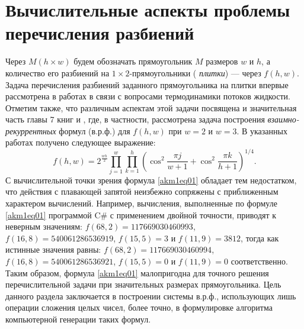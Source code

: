 \chapter{Вычислительные аспекты проблемы перечисления разбиений}\label{akm1-chap}









Через $M(h\times w)$ будем обозначать прямоугольник $M$ размеров $w$ и $h$, а количество его разбиений на $1\times 2$-прямоугольники (\textit{ плитки}) --- через $f(h,w)$.
Задача перечисления разбиений заданного прямоугольника на плитки впервые рассмотрена в работах \cite{akm_2, akm_3} в связи с вопросами термодинамики потоков жидкости. Отметим также, что различным аспектам этой задачи посвящена и значительная часть главы 7 книг \cite{akm_6} и \cite{akm_7}, где, в частности, рассмотрена задача построения \textit{ взаимно-рекуррентных} формул (в.р.ф.) для $f(h,w)$ при $w=2$ и $w=3$.
В указанных работах получено следующее  выражение:
\begin{equation}\label{akm1eq01}
f(h,w)=2^{\frac{wh}{2}}\prod_{j=1}^{w} \prod_{k=1}^{h}
\left(
\cos^2{\frac{\pi j}{w+1}}
+\cos^2{\frac{\pi k}{h+1}}
\right)^{1/4}.
\end{equation}
С вычислительной точки зрения формула \eqref{akm1eq01} обладает тем недостатком, что действия с плавающей запятой неизбежно сопряжены с приближенным характером вычислений. Например, вычисления, выполненные по формуле \eqref{akm1eq01} программой C\# с применением двойной точности, приводят к неверным значениям: $f(68,2)=117669030460993$, $f(16,8)=540061286536919$, $f(15,5)=3$ и $f(11,9)=3812$, тогда как истинные значения равны: $f(68,2)=117669030460994$, $f(16,8)=540061286536921$, $f(15,5)=0$ и $f(11,9)=0$ соответственно. Таким образом, формула \eqref{akm1eq01} малопригодна для точного решения перечислительной задачи при значительных размерах прямоугольника.
Цель данного раздела заключается в построении системы в.р.ф., использующих лишь операции сложения целых чисел, более точно, в формулировке алгоритма компьютерной генерации таких формул.

